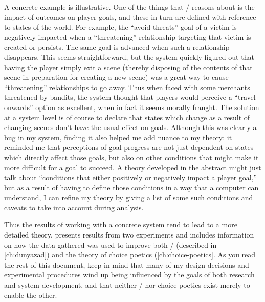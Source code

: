 A concrete example is illustrative.
%
One of the things that \dunyazad/ reasons about is the impact of outcomes on player goals, and these in turn are defined with reference to states of the world.
%
For example, the ``avoid threats'' goal of a victim is negatively impacted when a ``threatening'' relationship targeting that victim is created or persists.
%
The same goal is advanced when such a relationship disappears.
%
This seems straightforward, but the system quickly figured out that having the player simply exit a scene (thereby disposing of the contents of that scene in preparation for creating a new scene) was a great way to cause ``threatening'' relationships to go away.
%
Thus when faced with some merchants threatened by bandits, the system thought that players would perceive a ``travel onwards'' option as excellent, when in fact it seems morally fraught.
%
The solution at a system level is of course to declare that states which change as a result of changing scenes don't have the usual effect on goals.
%
Although this was clearly a bug in my system, finding it also helped me add nuance to my theory: it reminded me that perceptions of goal progress are not just dependent on states which directly affect those goals, but also on other conditions that might make it more difficult for a goal to succeed.
%
A theory developed in the abstract might just talk about ``conditions that either positively or negatively impact a player goal,'' but as a result of having to define those conditions in a way that a computer can understand, I can refine my theory by giving a list of some such conditions and caveats to take into account during analysis.


Thus the results of working with a concrete system tend to lead to a more detailed theory.
%
 presents results from two experiments and includes information on how the data gathered was used to improve both \dunyazad/ (described in \cref{ch:dunyazad}) and the theory of choice poetics (\cref{ch:choice-poetics}.
%
As you read the rest of this document, keep in mind that many of my design decisions and experimental procedures wind up being influenced by the goals of both research and system development, and that neither \dunyazad/ nor choice poetics exist merely to enable the other.
